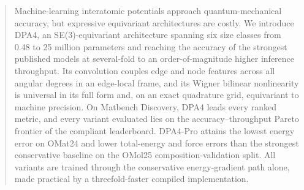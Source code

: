 \begin{abstract}
    Machine-learning interatomic potentials approach quantum-mechanical accuracy, but expressive equivariant architectures are costly.
    We introduce DPA4, an SE(3)-equivariant architecture spanning six size classes from 0.48 to 25 million parameters and reaching the accuracy of the strongest published models at several-fold to an order-of-magnitude higher inference throughput.
    Its convolution couples edge and node features across all angular degrees in an edge-local frame, and its Wigner bilinear nonlinearity is universal in its full form and, on an exact quadrature grid, equivariant to machine precision.
    On Matbench Discovery, DPA4 leads every ranked metric, and every variant evaluated lies on the accuracy--throughput Pareto frontier of the compliant leaderboard.
    DPA4-Pro attains the lowest energy error on OMat24 and lower total-energy and force errors than the strongest conservative baseline on the OMol25 composition-validation split.
    All variants are trained through the conservative energy-gradient path alone, made practical by a threefold-faster compiled implementation.
\end{abstract}
